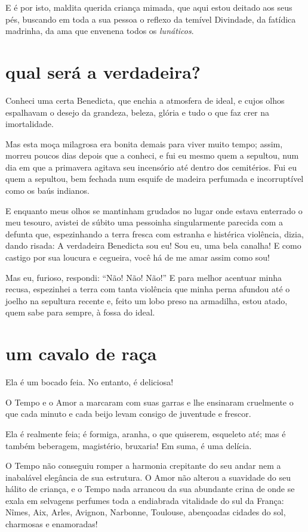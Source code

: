 E é por isto, maldita querida criança mimada, que aqui estou deitado
aos seus pés, buscando em toda a sua pessoa o reflexo da temível
Divindade, da fatídica madrinha, da ama que envenena todos os
\textit{lunáticos}.

\quebra\section[Qual será a verdadeira?]{qual será a verdadeira?}

Conheci uma certa Benedicta, que enchia a atmosfera de ideal, e cujos
olhos espalhavam o desejo da grandeza, beleza, glória e tudo o
que faz crer na imortalidade.

Mas esta moça milagrosa era bonita demais para viver muito tempo;
assim, morreu poucos dias depois que a conheci, e fui eu
mesmo quem a sepultou, num dia em que a primavera agitava seu
incensório até dentro dos cemitérios. Fui eu quem a sepultou, bem
fechada num esquife de madeira perfumada e incorruptível como os baús
indianos.

E enquanto meus olhos se mantinham grudados no lugar onde estava enterrado
o meu tesouro, avistei de súbito uma pessoinha singularmente parecida com a defunta que, espezinhando a terra fresca com 
estranha e histérica violência, dizia, dando risada:
A verdadeira Benedicta sou eu! Sou eu, uma bela
canalha! E como castigo por sua loucura e cegueira, você há de me amar assim
como sou!

Mas eu, furioso, respondi: “Não! Não! Não!''
E para melhor acentuar minha recusa, espezinhei a
terra com tanta violência que minha perna afundou até o joelho na sepultura recente e, feito
um lobo preso na armadilha, estou atado, quem sabe para sempre, à fossa
do ideal.

\quebra\section[Um cavalo de raça]{um cavalo de raça}

Ela é um bocado feia. No entanto, é deliciosa!

O Tempo e o Amor a marcaram com suas garras e lhe ensinaram cruelmente o
que cada minuto e cada beijo levam consigo de juventude e frescor.

Ela é realmente feia; é formiga, aranha, o que quiserem, esqueleto até;
mas é também beberagem, magistério, bruxaria! Em suma, é uma delícia.

O Tempo não conseguiu romper a harmonia crepitante do seu andar nem a
inabalável elegância de sua estrutura. O Amor não alterou a suavidade
do seu hálito de criança, e o Tempo nada arrancou da sua abundante
crina de onde se exala em selvagens perfumes toda a
endiabrada vitalidade do sul da França: Nîmes, Aix, Arles, Avignon, Narbonne,
Toulouse, abençoadas cidades do sol, charmosas e enamoradas!

